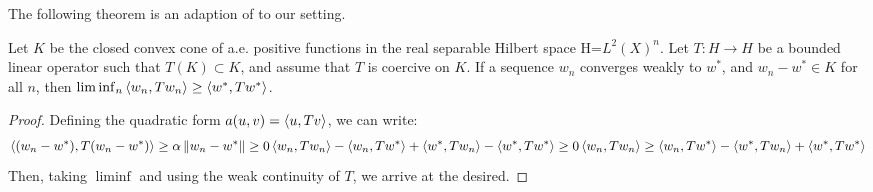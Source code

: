 
The following theorem is an adaption of \citep[Theorem 3.3]{} to our setting.

\begin{lemma}\label{lem:technical}
	Let $K$ be the closed convex cone of a.e. positive functions in the real separable Hilbert space H=$L^2(X)^n$. Let $T:H \to H$ be a bounded linear operator such that $T(K) \subset K$, and assume that $T$ is coercive on $K$. If a sequence $w_n$ converges weakly to $w^*$, and $w_n - w^* \in K$ for all $n$, then $\liminf_{n} \left \langle w_n,T w_n \right \rangle \geq \left \langle w^*,Tw^* \right \rangle$.
\end{lemma}
\begin{proof}
	Defining the quadratic form $a(u,v)=\left \langle u,Tv \right \rangle$, we can write:
	\begin{align*}
		\left \langle (w_n-w^*),T(w_n-w^*) \right \rangle \geq \alpha \left \Vert w_n-w^* \right \Vert \geq 0
		\left \langle w_n,Tw_n \right \rangle-\left \langle w_n,Tw^* \right \rangle+\left \langle w^*,Tw_n \right \rangle - \left \langle w^*,Tw^* \right \rangle \geq 0
		\left \langle w_n,Tw_n \right \rangle \geq \left \langle w_n,Tw^* \right \rangle-\left \langle w^*,Tw_n \right \rangle +\left \langle w^*,Tw^* \right \rangle
	\end{align*}
	Then, taking $\liminf$ and using the weak continuity of $T$, we arrive at the desired.
\end{proof}
